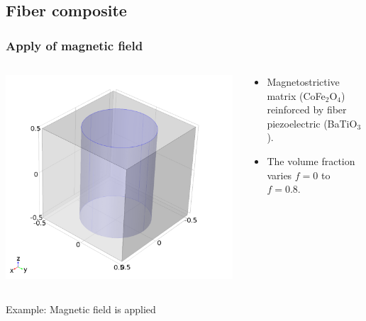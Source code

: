 \documentclass[compress]{beamer}
\begin{document}
\subsection{Fiber composite}
\begin{frame}\frametitle{Apply of magnetic field}
\begin{columns}[totalwidth=\textwidth]
   \begin{column}{.30\textwidth}
   \centering
   \includegraphics[width=0.99\textwidth]{Graphic/04_geocylin.pdf}
   \end{column}
   \begin{column}{.70\textwidth}
   \centering
   \begin{itemize}[label=$\bullet$, font=\small, leftmargin=*]
	\item Magnetostrictive matrix (CoFe$_2$O$_4$) reinforced by fiber piezoelectric (BaTiO$_3$).
	\item The volume fraction varies $f=0$ to $f=0.8$.
	\end{itemize}
   \end{column}
\end{columns}
\begin{columns}[totalwidth=\textwidth]
	\begin{column}{.25\textwidth}
   \centering
   Example:
   Magnetic field is applied
   \end{column}
   \begin{column}{.35\textwidth}

\end{column}
\end{columns}
\end{frame}
\end{document}
